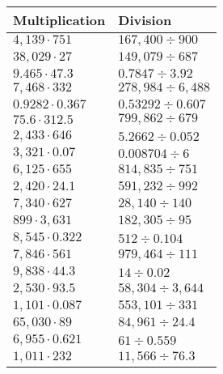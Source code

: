 \begin{longtable}[]{@{}ll@{}}
\toprule
Multiplication & Division\tabularnewline
\midrule
\endhead
\(4,139\cdot751\) & \(167,400÷900\)\tabularnewline
\(38,029\cdot27\) & \(149,079÷687\)\tabularnewline
\(9.465\cdot47.3\) & \(0.7847÷3.92\)\tabularnewline
\(7,468\cdot332\) & \(278,984÷6,488\)\tabularnewline
\(0.9282\cdot0.367\) & \(0.53292÷0.607\)\tabularnewline
\(75.6\cdot312.5\) & \(799,862÷679\)\tabularnewline
\(2,433\cdot646\) & \(5.2662÷0.052\)\tabularnewline
\(3,321\cdot0.07\) & \(0.008704÷6\)\tabularnewline
\(6,125\cdot655\) & \(814,835÷751\)\tabularnewline
\(2,420\cdot24.1\) & \(591,232÷992\)\tabularnewline
\(7,340\cdot627\) & \(28,140÷140\)\tabularnewline
\(899\cdot3,631\) & \(182,305÷95\)\tabularnewline
\(8,545\cdot0.322\) & \(512÷0.104\)\tabularnewline
\(7,846\cdot561\) & \(979,464÷111\)\tabularnewline
\(9,838\cdot44.3\) & \(14÷0.02\)\tabularnewline
\(2,530\cdot93.5\) & \(58,304÷3,644\)\tabularnewline
\(1,101\cdot0.087\) & \(553,101÷331\)\tabularnewline
\(65,030\cdot89\) & \(84,961÷24.4\)\tabularnewline
\(6,955\cdot0.621\) & \(61÷0.559\)\tabularnewline
\(1,011\cdot232\) & \(11,566÷76.3\)\tabularnewline
\bottomrule
\end{longtable}
